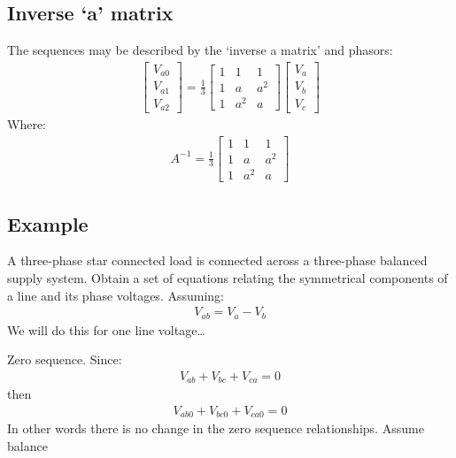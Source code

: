 \subsection{Inverse `a' matrix}
The sequences may be described by the `inverse a matrix' and phasors:
\begin{gather}
	\begin{bmatrix}
		V_{a0} \\
		V_{a1} \\
		V_{a2}
	\end{bmatrix} = \frac{1}{3}\begin{bmatrix}
		1 & 1   & 1   \\
		1 & a   & a^2 \\
		1 & a^2 & a
	\end{bmatrix}\begin{bmatrix}
		V_a \\
		V_b \\
		V_c
	\end{bmatrix}
\end{gather}
Where:
\begin{gather}
	A^{-1} = \frac{1}{3}\begin{bmatrix}
		1 & 1   & 1   \\
		1 & a   & a^2 \\
		1 & a^2 & a
	\end{bmatrix}
\end{gather}
\subsection{Example}
A three-phase star connected load is connected across a three-phase balanced supply system. Obtain a set of equations relating the symmetrical components of a line and its phase voltages. Assuming:
\begin{gather}
	V_{ab} = V_a - V_b
\end{gather}
We will do this for one line voltage\dots

Zero sequence. Since:
\begin{gather}
	V_{ab} + V_{bc} + V_{ca} = 0
\end{gather}
then
\begin{gather}
	V_{ab0} + V_{bc0} + V_{ca0} = 0
\end{gather}
In other words there is no change in the zero sequence relationships. Assume balance

